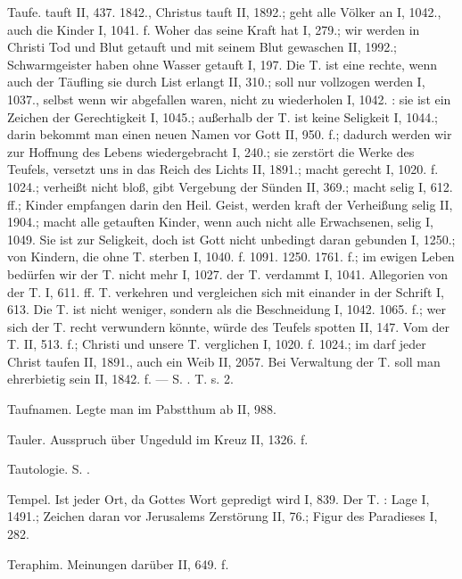 Taufe.  tauft II, 437. 1842., Christus tauft II, 1892.; geht alle Völker an I, 1042., auch die Kinder I, 1041. f. Woher das  seine Kraft hat I, 279.; wir werden in Christi Tod und Blut getauft und mit seinem Blut gewaschen II, 1992.; Schwarmgeister haben ohne Wasser getauft I, 197. Die T. ist eine rechte, wenn auch der Täufling sie durch List erlangt II, 310.; soll nur  vollzogen werden I, 1037., selbst wenn wir abgefallen waren, nicht zu wiederholen I, 1042. : sie ist ein Zeichen der Gerechtigkeit I, 1045.; außerhalb der T. ist keine Seligkeit I, 1044.; darin bekommt man einen neuen Namen vor Gott II, 950. f.; dadurch werden wir zur Hoffnung des Lebens wiedergebracht I, 240.; sie zerstört die Werke des Teufels, versetzt uns in das Reich des Lichts II, 1891.; macht gerecht I, 1020. f. 1024.; verheißt nicht bloß, gibt Vergebung der Sünden II, 369.; macht selig I, 612. ff.; Kinder empfangen darin den Heil. Geist, werden kraft der Verheißung selig II, 1904.; macht alle getauften Kinder, wenn auch nicht alle Erwachsenen, selig I, 1049. Sie ist  zur Seligkeit, doch ist Gott nicht unbedingt daran gebunden I, 1250.; von Kindern, die ohne T. sterben I, 1040. f. 1091. 1250. 1761. f.; im ewigen Leben bedürfen wir der T. nicht mehr I, 1027.  der T. verdammt I, 1041. Allegorien von der T. I, 611. ff.  T. verkehren und vergleichen sich mit einander in der Schrift I, 613. Die T. ist nicht weniger, sondern  als die Beschneidung I, 1042. 1065. f.; wer sich der T. recht verwundern könnte, würde des Teufels spotten II, 147. Vom  der T. II, 513. f.; Christi und unsere T. verglichen I, 1020. f. 1024.; im  darf jeder Christ taufen II, 1891., auch ein Weib II, 2057. Bei Verwaltung der T. soll man ehrerbietig sein II, 1842. f. — S. . T.  s.  2.

Taufnamen. Legte man im Pabstthum ab II, 988.

Tauler. Ausspruch über Ungeduld im Kreuz II, 1326. f.

Tautologie. S. .

Tempel. Ist jeder Ort, da Gottes Wort gepredigt wird I, 839. Der T. : Lage I, 1491.; Zeichen daran vor Jerusalems Zerstörung II, 76.; Figur des Paradieses I, 282.

Teraphim. Meinungen darüber II, 649. f.

